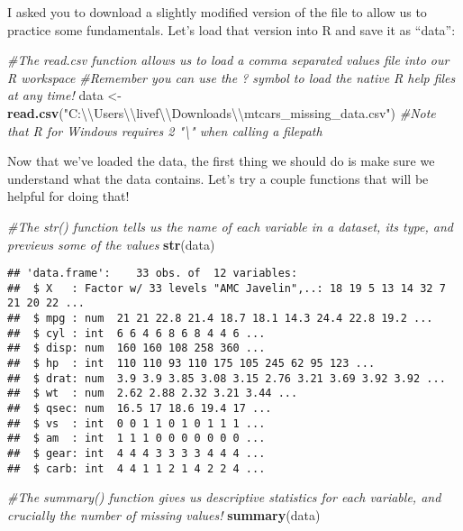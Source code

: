 \documentclass[]{article}
\newenvironment{Shaded}{\begin{snugshade}}{\end{snugshade}}
\newcommand{\KeywordTok}[1]{\textcolor[rgb]{0.13,0.29,0.53}{\textbf{#1}}}
\newcommand{\CharTok}[1]{\textcolor[rgb]{0.31,0.60,0.02}{#1}}
\newcommand{\StringTok}[1]{\textcolor[rgb]{0.31,0.60,0.02}{#1}}
\newcommand{\CommentTok}[1]{\textcolor[rgb]{0.56,0.35,0.01}{\textit{#1}}}
\newcommand{\NormalTok}[1]{#1}
\begin{document}
I asked you to download a slightly modified version of the file to allow
us to practice some fundamentals. Let's load that version into R and
save it as ``data'':

\begin{Shaded}
\begin{Highlighting}[]
\CommentTok{#The read.csv function allows us to load a comma separated values file into our R workspace}
\CommentTok{#Remember you can use the ? symbol to load the native R help files at any time!}
\NormalTok{data <-}\StringTok{ }\KeywordTok{read.csv}\NormalTok{(}\StringTok{"C:}\CharTok{\textbackslash{}\textbackslash{}}\StringTok{Users}\CharTok{\textbackslash{}\textbackslash{}}\StringTok{livef}\CharTok{\textbackslash{}\textbackslash{}}\StringTok{Downloads}\CharTok{\textbackslash{}\textbackslash{}}\StringTok{mtcars_missing_data.csv"}\NormalTok{)}
\CommentTok{#Note that R for Windows requires 2 "\textbackslash{}" when calling a filepath }
\end{Highlighting}
\end{Shaded}

Now that we've loaded the data, the first thing we should do is make
sure we understand what the data contains. Let's try a couple functions
that will be helpful for doing that!

\begin{Shaded}
\begin{Highlighting}[]
\CommentTok{#The str() function tells us the name of each variable in a dataset, its type, and previews some of the values}
\KeywordTok{str}\NormalTok{(data)}
\end{Highlighting}
\end{Shaded}

\begin{verbatim}
## 'data.frame':    33 obs. of  12 variables:
##  $ X   : Factor w/ 33 levels "AMC Javelin",..: 18 19 5 13 14 32 7 21 20 22 ...
##  $ mpg : num  21 21 22.8 21.4 18.7 18.1 14.3 24.4 22.8 19.2 ...
##  $ cyl : int  6 6 4 6 8 6 8 4 4 6 ...
##  $ disp: num  160 160 108 258 360 ...
##  $ hp  : int  110 110 93 110 175 105 245 62 95 123 ...
##  $ drat: num  3.9 3.9 3.85 3.08 3.15 2.76 3.21 3.69 3.92 3.92 ...
##  $ wt  : num  2.62 2.88 2.32 3.21 3.44 ...
##  $ qsec: num  16.5 17 18.6 19.4 17 ...
##  $ vs  : int  0 0 1 1 0 1 0 1 1 1 ...
##  $ am  : int  1 1 1 0 0 0 0 0 0 0 ...
##  $ gear: int  4 4 4 3 3 3 3 4 4 4 ...
##  $ carb: int  4 4 1 1 2 1 4 2 2 4 ...
\end{verbatim}

\begin{Shaded}
\begin{Highlighting}[]
\CommentTok{#The summary() function gives us descriptive statistics for each variable, and crucially the number of missing values!}
\KeywordTok{summary}\NormalTok{(data)}
\end{Highlighting}
\end{Shaded}
\end{document}
